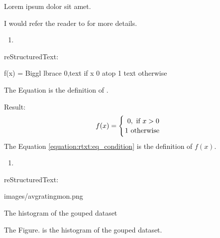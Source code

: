 \documentclass[letterpaper,12pt,english]{sphinxmanual}
\begin{document}
Lorem ipsum  dolor sit amet.

I would refer the reader to  for more details.
\begin{enumerate}
\def\theenumi{\arabic{enumi}}
\def\labelenumi{\theenumi .}
\makeatletter\def\p@enumii{\p@enumi \theenumi .}\makeatother
\setcounter{enumi}{1}
\item {} 

\end{enumerate}

reStructuredText:

\begin{sphinxVerbatim}[commandchars=\\\{\}]
 
    

        f(x)
        =
        \PYGZbs{}Biggl \PYGZbs{}lbrace
        \PYGZob{}
        0,\PYGZbs{}text\PYGZob{} if \PYGZcb{}
           \PYGZob{} x \PYGZgt{}0\PYGZcb{}
        \PYGZbs{}atop
        1 \PYGZbs{}text\PYGZob{} otherwise \PYGZcb{}
        \PYGZcb{}

The Equation  is the definition of .
\end{sphinxVerbatim}

Result:
\begin{equation}\label{equation:rtxt:eq_condition}
\begin{split}     f(x)
     =
     \Biggl \lbrace
     {
     0,\text{ if }
        { x >0}
     \atop
     1 \text{ otherwise }
     }\end{split}
\end{equation}
The Equation \eqref{equation:rtxt:eq_condition} is the definition of \(f(x)\).
\begin{enumerate}
\def\theenumi{\arabic{enumi}}
\def\labelenumi{\theenumi .}
\makeatletter\def\p@enumii{\p@enumi \theenumi .}\makeatother
\setcounter{enumi}{3}
\item {} 

\end{enumerate}

reStructuredText:

\begin{sphinxVerbatim}[commandchars=\\\{\}]
 
  images/avg\PYGZus{}rating\PYGZus{}mon.png
    
    

   The histogram of the gouped dataset

The Figure.  is the histogram of the gouped dataset.
\end{sphinxVerbatim}
\end{document}
